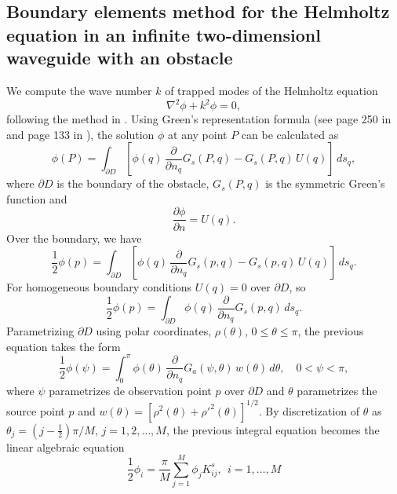 \documentclass[11pt]{article}
\begin{document}
\subsection{Boundary elements method for the Helmholtz equation in an infinite two-dimensionl waveguide with an obstacle}
We compute the wave number $k$ of trapped modes of the Helmholtz equation
\begin{equation}
  \label{eq:16}
  \nabla^2\phi + k^2\phi = 0,
\end{equation}
following the method in \cite{linton1992integral}. Using Green's representation formula (see page 250 in \cite{olver2014introduction} and page 133 in \cite{newman2018marine}), the solution $\phi$ at any point $P$ can be calculated as
\begin{equation}
  \label{eq:18}
\phi(P) = \int_{\partial D} \left[ \phi(q)\, 
\frac{\partial}{\partial n_q} G_s(P,q) 
- G_s(P,q)\, U(q) \right] \, ds_q ,
\end{equation}
where $\partial D$ is the boundary of the obstacle, $G_s(P,q)$ is the symmetric Green's function and
\begin{equation}
  \label{eq:19}
  \frac{\partial\phi}{\partial n} = U(q).
\end{equation}
Over the boundary, we have
\begin{equation}
  \label{eq:20}
  \frac{1}{2}\phi(p) = \int_{\partial D} \left[ \phi(q)\, 
\frac{\partial}{\partial n_q} G_s(p,q) 
- G_s(p,q)\, U(q) \right] \, ds_q.
\end{equation}
For homogeneous boundary conditions $U(q)=0$ over $\partial D$, so
\begin{equation}
  \label{eq:21}
  \frac{1}{2}\phi(p) = \int_{\partial D} \phi(q)\, 
\frac{\partial}{\partial n_q} G_s(p,q)  \, ds_q.  
\end{equation}
Parametrizing $\partial D$ using polar coordinates, $\rho(\theta)$, $0 \le \theta \le \pi$, the previous equation takes the form
\begin{equation}
  \label{eq:22}
  \frac{1}{2}\phi(\psi) = \int_{0}^{\pi} 
\phi(\theta) \, \frac{\partial}{\partial n_q} 
G_a(\psi,\theta)\, w(\theta) \, d\theta, 
\quad 0 < \psi < \pi ,
\end{equation}
where $\psi$ parametrizes de observation point $p$ over $\partial D$ and $\theta$ parametrizes the source point $p$ and $w(\theta) = [\rho^2(\theta) + \rho'^2(\theta)]^{1/2}$. By discretization of $\theta$ as $\theta_j = (j-\frac{1}{2})\pi/M$, $j=1,2,\ldots,M$, the previous integral equation becomes the linear algebraic equation
\begin{equation}
  \label{eq:23}
  \frac{1}{2} \phi_i = \frac{\pi}{M}\sum_{j=1}^M \phi_j K_{ij}^s,~~i=1,\ldots,M
\end{equation}
\end{document}

